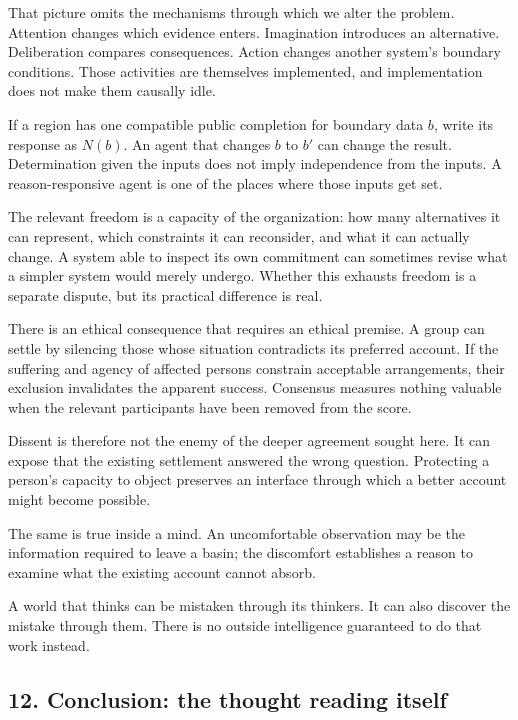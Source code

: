 \documentclass[
  11pt,
]{article}
\begin{document}
That picture omits the mechanisms through which we alter the problem.
Attention changes which evidence enters. Imagination introduces an
alternative. Deliberation compares consequences. Action changes another
system's boundary conditions. Those activities are themselves
implemented, and implementation does not make them causally idle.

If a region has one compatible public completion for boundary data
\(b\), write its response as \(N(b)\). An agent that changes \(b\) to
\(b'\) can change the result. Determination given the inputs does not
imply independence from the inputs. A reason-responsive agent is one of
the places where those inputs get set.

The relevant freedom is a capacity of the organization: how many
alternatives it can represent, which constraints it can reconsider, and
what it can actually change. A system able to inspect its own commitment
can sometimes revise what a simpler system would merely undergo. Whether
this exhausts freedom is a separate dispute, but its practical
difference is real.

There is an ethical consequence that requires an ethical premise. A
group can settle by silencing those whose situation contradicts its
preferred account. If the suffering and agency of affected persons
constrain acceptable arrangements, their exclusion invalidates the
apparent success. Consensus measures nothing valuable when the relevant
participants have been removed from the score.

Dissent is therefore not the enemy of the deeper agreement sought here.
It can expose that the existing settlement answered the wrong question.
Protecting a person's capacity to object preserves an interface through
which a better account might become possible.

The same is true inside a mind. An uncomfortable observation may be the
information required to leave a basin; the discomfort establishes a
reason to examine what the existing account cannot absorb.

A world that thinks can be mistaken through its thinkers. It can also
discover the mistake through them. There is no outside intelligence
guaranteed to do that work instead.

\subsection{12. Conclusion: the thought reading
itself}\label{conclusion-the-thought-reading-itself}
\end{document}
